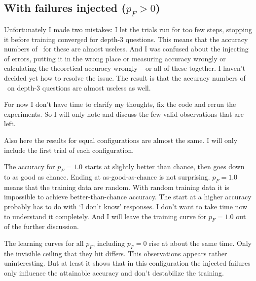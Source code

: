 \documentclass{farlamp}
\begin{document}
\subsection{With failures injected ($p_F > 0$)}

Unfortunately I made two mistakes: I let the trials run for too few steps,
stopping it before training converged for depth-3 questions. This means that the
accuracy numbers of \Xpa\ for these are almost useless. And I was confused about
the injecting of errors, putting it in the wrong place or measuring accuracy
wrongly or calculating the theoretical accuracy wrongly – or all of these
together. \TODO{}I haven't decided yet how to resolve the issue. The result is
that the accuracy numbers of \AmpHp\ on depth-3 questions are almost useless as
well.

For now I don't have time to clarify my thoughts, fix the code and rerun the
experiments. So I will only note and discuss the few valid observations that are
left.

\begin{LCRow}
\Obs Also here the results for equal configurations are almost the same.
\Disc I will only include the first trial of each configuration.
\end{LCRow}

\begin{LCRow}
\end{LCRow}
\Obs The accuracy for $p_F = 1.0$ starts at slightly better than chance, then
goes down to as good as chance.
\Disc Ending at as-good-as-chance is not surprising. $p_F = 1.0$ means that the
training data are random. With random training data it is impossible to achieve
better-than-chance accuracy. \OQ{}The start at a higher accuracy probably has to
do with ‘I don't know’ responses. I don't want to take time now to understand it
completely. And I will leave the training curve for $p_F = 1.0$ out of the
further discussion.

\begin{LCRow}
\Obs The learning curves for all $p_F$, including $p_F = 0$ rise at about the
same time. Only the invisible ceiling that they hit differs.
\Disc This observations appears rather uninteresting. But at least it shows that
in this configuration the injected failures only influence the attainable
accuracy and don't destabilize the training.
\end{LCRow}
\end{document}
